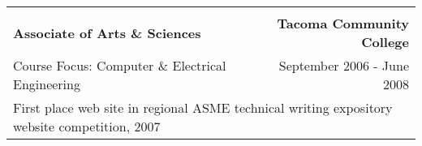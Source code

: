 \documentclass[letterpaper]{article}
\begin{document}
\begin{center}
\begin{tabular}{p{}r}
			\\
			\\
				\textbf{Associate of Arts \& Sciences}		    	&
				\textbf{Tacoma Community College \quad}
			\\
				{\quad Course Focus: Computer \& Electrical Engineering}	&
				{September 2006 - June 2008 \quad\quad}	
			\\
				\multicolumn{2}{p{\textwidth}}{\quad First place web site in regional ASME technical writing expository website competition, 2007}
			\\
		\end{tabular} \\
	\end{center} 
\end{document}
